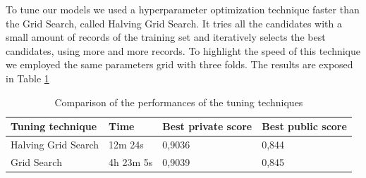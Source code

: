 \documentclass[conference]{IEEEtran}
\begin{document}
To tune our models we used a hyperparameter optimization technique faster than the Grid Search, called Halving Grid Search\cite{halving}. It tries all the candidates with a small amount of records of the training set and iteratively selects the best candidates, using more and more records\cite{halving_explanation}. To highlight the speed of this technique we employed the same parameters grid with three folds. The results are exposed in Table \ref{tab:tuning_tech}
\begin{table}[h]
\begin{tabular}{@{}llll@{}}
\toprule
\textbf{Tuning technique}    & \textbf{Time}      & \textbf{Best private score} & \textbf{Best public score} \\ \midrule
Halving Grid Search & 12m 24s   & 0,9036             & 0,844             \\
Grid Search         & 4h 23m 5s & 0,9039             & 0,845             \\ \bottomrule
\end{tabular}
\caption{Comparison of the performances of the tuning techniques}
\label{tab:tuning_tech}
\end{table}
\end{document}
